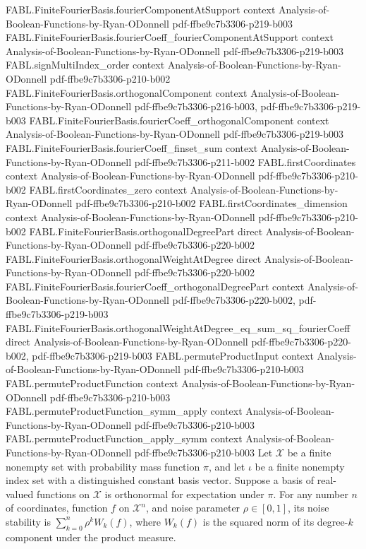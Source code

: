 \begin{theorem}
  {FABL.FiniteFourierBasis.fourierComponentAtSupport}
  {context}
  {Analysis-of-Boolean-Functions-by-Ryan-ODonnell}
  {pdf-ffbe9c7b3306-p219-b003}
\proofstep
  {FABL.FiniteFourierBasis.fourierCoeff_fourierComponentAtSupport}
  {context}
  {Analysis-of-Boolean-Functions-by-Ryan-ODonnell}
  {pdf-ffbe9c7b3306-p219-b003}
\proofstep
  {FABL.signMultiIndex_order}
  {context}
  {Analysis-of-Boolean-Functions-by-Ryan-ODonnell}
  {pdf-ffbe9c7b3306-p210-b002}
\proofstep
  {FABL.FiniteFourierBasis.orthogonalComponent}
  {context}
  {Analysis-of-Boolean-Functions-by-Ryan-ODonnell}
  {pdf-ffbe9c7b3306-p216-b003,
    pdf-ffbe9c7b3306-p219-b003}
\proofstep
  {FABL.FiniteFourierBasis.fourierCoeff_orthogonalComponent}
  {context}
  {Analysis-of-Boolean-Functions-by-Ryan-ODonnell}
  {pdf-ffbe9c7b3306-p219-b003}
\proofstep
  {FABL.FiniteFourierBasis.fourierCoeff_finset_sum}
  {context}
  {Analysis-of-Boolean-Functions-by-Ryan-ODonnell}
  {pdf-ffbe9c7b3306-p211-b002}
\proofstep
  {FABL.firstCoordinates}
  {context}
  {Analysis-of-Boolean-Functions-by-Ryan-ODonnell}
  {pdf-ffbe9c7b3306-p210-b002}
\proofstep
  {FABL.firstCoordinates_zero}
  {context}
  {Analysis-of-Boolean-Functions-by-Ryan-ODonnell}
  {pdf-ffbe9c7b3306-p210-b002}
\proofstep
  {FABL.firstCoordinates_dimension}
  {context}
  {Analysis-of-Boolean-Functions-by-Ryan-ODonnell}
  {pdf-ffbe9c7b3306-p210-b002}
\proofstep
  {FABL.FiniteFourierBasis.orthogonalDegreePart}
  {direct}
  {Analysis-of-Boolean-Functions-by-Ryan-ODonnell}
  {pdf-ffbe9c7b3306-p220-b002}
\proofstep
  {FABL.FiniteFourierBasis.orthogonalWeightAtDegree}
  {direct}
  {Analysis-of-Boolean-Functions-by-Ryan-ODonnell}
  {pdf-ffbe9c7b3306-p220-b002}
\proofstep
  {FABL.FiniteFourierBasis.fourierCoeff_orthogonalDegreePart}
  {context}
  {Analysis-of-Boolean-Functions-by-Ryan-ODonnell}
  {pdf-ffbe9c7b3306-p220-b002,
    pdf-ffbe9c7b3306-p219-b003}
\proofstep
  {FABL.FiniteFourierBasis.orthogonalWeightAtDegree_eq_sum_sq_fourierCoeff}
  {direct}
  {Analysis-of-Boolean-Functions-by-Ryan-ODonnell}
  {pdf-ffbe9c7b3306-p220-b002,
    pdf-ffbe9c7b3306-p219-b003}
\proofstep
  {FABL.permuteProductInput}
  {context}
  {Analysis-of-Boolean-Functions-by-Ryan-ODonnell}
  {pdf-ffbe9c7b3306-p210-b003}
\proofstep
  {FABL.permuteProductFunction}
  {context}
  {Analysis-of-Boolean-Functions-by-Ryan-ODonnell}
  {pdf-ffbe9c7b3306-p210-b003}
\proofstep
  {FABL.permuteProductFunction_symm_apply}
  {context}
  {Analysis-of-Boolean-Functions-by-Ryan-ODonnell}
  {pdf-ffbe9c7b3306-p210-b003}
\proofstep
  {FABL.permuteProductFunction_apply_symm}
  {context}
  {Analysis-of-Boolean-Functions-by-Ryan-ODonnell}
  {pdf-ffbe9c7b3306-p210-b003}
Let $\mathcal{X}$ be a finite nonempty set with probability mass function $\pi$, and let
$\iota$ be a finite nonempty index set with a distinguished constant basis vector.
Suppose a basis of real-valued functions on $\mathcal{X}$ is orthonormal for expectation
under $\pi$. For any number $n$ of coordinates, function $f$ on $\mathcal{X}^n$, and
noise parameter $\rho\in[0,1]$, its noise stability is $\sum_{k=0}^{n}\rho^k W_k(f)$,
where $W_k(f)$ is the squared norm of its degree-$k$ component under the product
measure.
\end{theorem}

